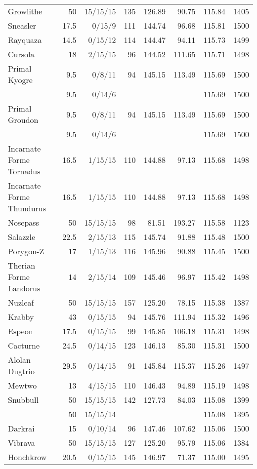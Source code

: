 \begin{longtable}{lrrrrrrr}
Growlithe & 50 & 15/15/15 & 135 & 126.89 & 90.75 & 115.84 & 1405\\
Sneasler & 17.5 & 0/15/9 & 111 & 144.74 & 96.68 & 115.81 & 1500\\
Rayquaza & 14.5 & 0/15/12 & 114 & 144.47 & 94.11 & 115.73 & 1499\\
Cursola & 18 & 2/15/15 & 96 & 144.52 & 111.65 & 115.71 & 1498\\
Primal Kyogre &  9.5 & 0/8/11 & 94 & 145.15 & 113.49 & 115.69 & 1500\\
 &  9.5 & 0/14/6 & & & & 115.69 & 1500\\
Primal Groudon &  9.5 & 0/8/11 & 94 & 145.15 & 113.49 & 115.69 & 1500\\
 &  9.5 & 0/14/6 & & & & 115.69 & 1500\\
Incarnate Forme Tornadus & 16.5 & 1/15/15 & 110 & 144.88 & 97.13 & 115.68 & 1498\\
Incarnate Forme Thundurus & 16.5 & 1/15/15 & 110 & 144.88 & 97.13 & 115.68 & 1498\\
Nosepass & 50 & 15/15/15 & 98 & 81.51 & 193.27 & 115.58 & 1123\\
Salazzle & 22.5 & 2/15/13 & 115 & 145.74 & 91.88 & 115.48 & 1500\\
Porygon-Z & 17 & 1/15/13 & 116 & 145.96 & 90.88 & 115.45 & 1500\\
Therian Forme Landorus & 14 & 2/15/14 & 109 & 145.46 & 96.97 & 115.42 & 1498\\
Nuzleaf & 50 & 15/15/15 & 157 & 125.20 & 78.15 & 115.38 & 1387\\
Krabby & 43 & 0/15/15 & 94 & 145.76 & 111.94 & 115.32 & 1496\\
Espeon & 17.5 & 0/15/15 & 99 & 145.85 & 106.18 & 115.31 & 1498\\
Cacturne & 24.5 & 0/14/15 & 123 & 146.13 & 85.30 & 115.31 & 1500\\
Alolan Dugtrio & 29.5 & 0/14/15 & 91 & 145.84 & 115.37 & 115.26 & 1497\\
Mewtwo & 13 & 4/15/15 & 110 & 146.43 & 94.89 & 115.19 & 1498\\
Snubbull & 50 & 15/15/15 & 142 & 127.73 & 84.03 & 115.08 & 1399\\
 & 50 & 15/15/14 & & & & 115.08 & 1395\\
Darkrai & 15 & 0/10/14 & 96 & 147.46 & 107.62 & 115.06 & 1500\\
Vibrava & 50 & 15/15/15 & 127 & 125.20 & 95.79 & 115.06 & 1384\\
Honchkrow & 20.5 & 0/15/15 & 145 & 146.97 & 71.37 & 115.00 & 1495\\

\end{longtable}
